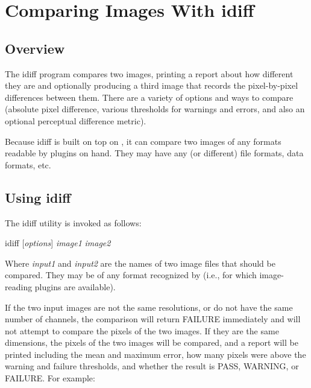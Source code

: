 \chapter{Comparing Images With {\kw idiff}}
\label{chap:idiff}

\section{Overview}
The {\cf idiff} program compares two images, printing a report about how
different they are and optionally producing a third image that records
the pixel-by-pixel differences between them.  There are a variety of
options and ways to compare (absolute pixel difference, various
thresholds for warnings and errors, and also an optional perceptual
difference metric).

Because {\cf idiff} is built on top on \product, it can compare two
images of any formats readable by \ImageInput plugins on hand.  They may
have any (or different) file formats, data formats, etc.

\section{Using {\cf idiff}}

The {\cf idiff} utility is invoked as follows:

\bigskip

\hspace{0.25in} {\cf idiff} [\emph{options}] \emph{image1} \emph{image2}

\medskip

Where \emph{input1} and \emph{input2} are the names of two image files
that should be compared.  They may be of any format recognized by
\product (i.e., for which image-reading plugins are available).

If the two input images are not the same resolutions, or do not have the
same number of channels, the comparison will return FAILURE immediately
and will not attempt to compare the pixels of the two images.  If 
they are the same dimensions, the pixels of the two images will be
compared, and a report will be printed including the mean and maximum
error, how many pixels were above the warning and failure thresholds,
and whether the result is {\cf PASS}, {\cf WARNING}, or {\cf FAILURE}.
For example:



